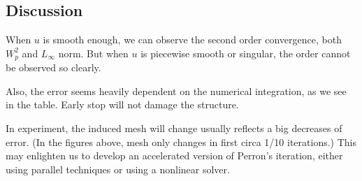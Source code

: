\documentclass{article}
\begin{document}
\subsection{Discussion}
When $u$ is smooth enough, we can observe the second order convergence, both $W_p^2$ and $L_{\infty}$ norm. But when $u$ is piecewise smooth or singular, the order cannot be observed so clearly. 

Also, the error seems heavily dependent on the numerical integration, as we see in the table. Early stop will not damage the structure. 

In experiment, the induced mesh will change usually reflects a big decreases of error. (In the figures above, mesh only changes in first circa 1/10 iterations.) This may enlighten us to develop an accelerated version of Perron's iteration, either using parallel techniques or using a nonlinear solver. 
\end{document}
